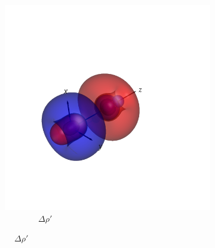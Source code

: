\documentclass[journal=inoraj,manuscript=article]{achemso}
\begin{document}
\begin{figure}[!h]
    \centering
    \centering
    \begin{subfigure}[t]{0.33\textwidth}
        \centering
        \includegraphics[width=\linewidth]{./AuFl+/diff_tot.png} 
        \caption*{\ \ \ \ \ \ \ \ $\Delta \rho'$} 
    \end{subfigure}
    \hfill
 

\end{figure}
\end{document}
